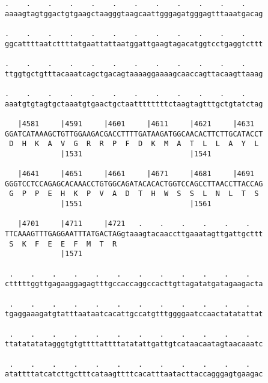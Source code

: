 \documentclass{article}
\begin{document}
\begin{Verbatim}
.    .    .    .    .    .    .    .    .    .    .    .    
aaaagtagtggactgtgaagctaagggtaagcaattgggagatgggagtttaaatgacag
                                                            
.    .    .    .    .    .    .    .    .    .    .    .    
ggcattttaatcttttatgaattattaatggattgaagtagacatggtcctgaggtcttt
                                                            
.    .    .    .    .    .    .    .    .    .    .    .    
ttggtgctgtttacaaatcagctgacagtaaaaggaaaagcaaccagttacaagttaaag
                                                            
.    .    .    .    .    .    .    .    .    .    .    .    
aaatgtgtagtgctaaatgtgaactgctaattttttttctaagtagtttgctgtatctag
                                                            
   |4581     |4591     |4601     |4611     |4621     |4631  
GGATCATAAAGCTGTTGGAAGACGACCTTTTGATAAGATGGCAACACTTCTTGCATACCT
 D  H  K  A  V  G  R  R  P  F  D  K  M  A  T  L  L  A  Y  L 
             |1531                         |1541            
  
   |4641     |4651     |4661     |4671     |4681     |4691  
GGGTCCTCCAGAGCACAAACCTGTGGCAGATACACACTGGTCCAGCCTTAACCTTACCAG
 G  P  P  E  H  K  P  V  A  D  T  H  W  S  S  L  N  L  T  S 
             |1551                         |1561            
  
   |4701     |4711     |4721   .    .    .    .    .    .   
TTCAAAGTTTGAGGAATTTATGACTAGgtaaagtacaaccttgaaatagttgattgcttt
 S  K  F  E  E  F  M  T  R                                  
             |1571                                          
  
 .    .    .    .    .    .    .    .    .    .    .    .   
ctttttggttgagaaggagagtttgccaccaggccacttgttagatatgatagaagacta
                                                            
 .    .    .    .    .    .    .    .    .    .    .    .   
tgaggaaagatgtatttaataatcacattgccatgtttggggaatccaactatatattat
                                                            
 .    .    .    .    .    .    .    .    .    .    .    .   
ttatatatatagggtgtgttttattttatatattgattgtcataacaatagtaacaaatc
                                                            
 .    .    .    .    .    .    .    .    .    .    .    .   
atattttatcatcttgctttcataagttttcacatttaatacttaccagggagtgaagac
                                                            

\end{Verbatim}
\end{document}
